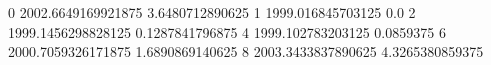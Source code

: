 0 2002.6649169921875 3.6480712890625
1 1999.016845703125 0.0
2 1999.1456298828125 0.1287841796875
4 1999.102783203125 0.0859375
6 2000.7059326171875 1.6890869140625
8 2003.3433837890625 4.3265380859375
